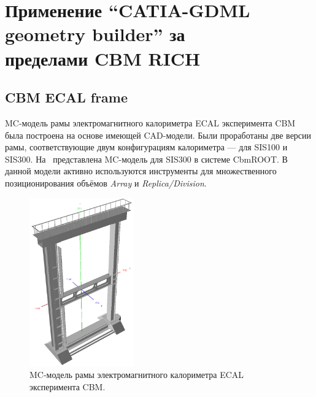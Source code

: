 
\section[Применение ``CATIA-GDML geometry builder'' за пределами CBM RICH]{Применение ``CATIA-GDML geometry builder'' за\\ пределами CBM RICH}\label{sec:secBuilderOtherUsage}

\subsection{CBM ECAL frame}\label{sec:secCbmEcalFrame}

MC-модель рамы электромагнитного калориметра ECAL эксперимента CBM была построена на основе имеющей CAD-модели. Были проработаны две версии рамы, соответствующие двум конфигурациям калориметра --- для SIS100 и SIS300. На~ представлена MC-модель для SIS300 в системе CbmROOT. В данной модели активно используются инструменты для множественного позиционирования объёмов \textit{Array} и \textit{Replica/Division}.


\begin{figure}[H]
\centering
\includegraphics[width=0.4\textwidth]{pictures/CBM_ECAL_frame.png}
\caption{MC-модель рамы электромагнитного калориметра ECAL эксперимента CBM.}
\label{fig:CbmEcalFrame}
\end{figure}

